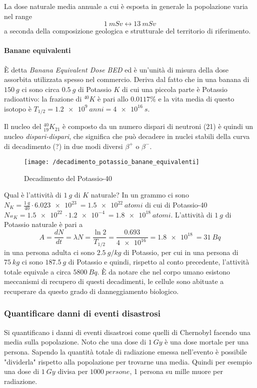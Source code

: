 La dose naturale media annuale a cui è esposta in generale la popolazione varia nel range
$$ \SI{1}{mSv} \leftrightarrow \SI{13}{mSv} $$
a seconda della composizione geologica e strutturale del territorio di riferimento.

\paragraph{Banane equivalenti} È detta \emph{Banana Equivalent Dose BED} ed è un'unità di misura della dose assorbita utilizzata spesso nel commercio.
Deriva dal fatto che in una banana di $\SI{150}{g}$ ci sono circa $\SI{0.5}{g}$ di Potassio $K$ di cui una piccola parte è Potassio radioattivo: la frazione di $^{40}K$ è pari allo $0.0117\%$ e la vita media di questo isotopo è $T_{1/2} = \SI{1.2e9}{anni}=\SI{4e16}{s}$.

Il nucleo del $^{40}_{19}K_{21}$ è composto da un numero dispari di neutroni (21) è quindi un nucleo \emph{dispari-dispari}, che significa che può decadere in nuclei stabili della curva di decadimento (?) in due modi diversi $\beta^+$ o $\beta^-$.
\begin{figure}[h]
\centering
\texttt{[image: /decadimento\_potassio\_banane\_equivalenti]}
\caption{Decadimento del Potassio-40}
\end{figure}

Qual è l'attività di $\SI{1}{g}$ di $K$ naturale?
In un grammo ci sono $N_K = \frac{\SI{1}{g}}{40} \cdot \SI{6.023e23}{} = \SI{1.5e22}{atomi}$ di cui di Potassio-40 
$ N_{^{40}K} = \SI{1.5e22}{} \cdot \SI{1.2e-4}{} = \SI{1.8e18}{atomi} $.
L'attività di $\SI{1}{g}$ di Potassio naturale è pari a
\begin{equation}
A = \frac{dN}{dt} = \lambda N = \frac{\ln 2}{T_{1/2}} = \frac{0.693}{\SI{4e16}{}} = \SI{1.8e18}{} = \SI{31}{Bq}
\end{equation}
in una persona adulta ci sono $\SI{2.5}{g/kg}$ di Potassio, per cui in una persona di $\SI{75}{kg}$ ci sono $\SI{187.5}{g}$ di Potassio e quindi, rispetto al conto precedente, l'attività totale equivale a circa $\SI{5800}{Bq}$.
È da notare che nel corpo umano esistono meccanismi di recupero di questi decadimenti, le cellule sono abituate a recuperare da questo grado di danneggiamento biologico.


\subsubsection{Quantificare danni di eventi disastrosi}
Si quantificano i danni di eventi disastrosi come quelli di Chernobyl facendo una media sulla popolazione.
Noto che una dose di $\SI{1}{Gy}$ è una dose mortale per una persona.
Sapendo la quantità totale di radiazione emessa nell'evento è possibile "dividerla" rispetto alla popolazione per trovarne una media.
Quindi per esempio una dose di $\SI{1}{Gy}$ divisa per $\SI{1000}{persone}$, 1 persona su mille muore per radiazione.

